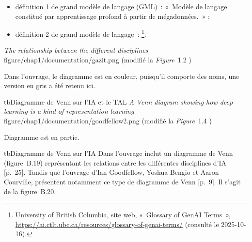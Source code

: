 {\begin{itemize}
    \item définition 1 de grand modèle de langage (GML)~: «~Modèle de langage constitué par apprentissage profond à partir de mégadonnées.~» \cite{Gdt_llm_0};
    \item définition 2 de grand modèle de langage~:  \footnote{University of British Columbia, site web, «~Glossary of GenAI Terms~», \url{https://ai.ctlt.ubc.ca/resources/glossary-of-genai-terms/} (consulté le 2025-10-16).}.
\end{itemize}
\figmediumen
{\textit{The relationship between the different disciplines}}
{figure/chap1/documentation/gazit.png}
{(modifié la \textit{Figure}~1.2 \cite{gazit_mastering_2024})}
{}
{
\begin{tablenotes}
\footnotesize
\item[a] {Dans l'ouvrage, le diagramme est en couleur, puisqu'il comporte des noms, une version en gris a été retenu ici.}
\end{tablenotes}
}{tb}{Diagramme de Venn sur l'IA et le TAL}
\figmediumen
{\textit{A Venn diagram showing how deep learning is a kind of representation learning \elide}}
{figure/chap1/documentation/goodfellow2.png}
{(modifié la \textit{Figure}~1.4 \cite{goodfellow_deep_2016})}
{}{
\begin{tablenotes}
\footnotesize
\item[a] {Diagramme est en partie.}
\end{tablenotes}
}{tb}{Diagramme de Venn sur l'IA}
Dans l'ouvrage  inclut un diagramme de Venn (figure~B.19) représentant les relations entre les différentes disciplines d'IA [p.~25]. Tandis que l'ouvrage   d'Ian Goodfellow, Yoshua Bengio et Aaron Courville, présentent notamment ce type de diagramme de Venn [p.~9]. Il s'agit de la figure~B.20. 
}{}

\figannexe{

}

